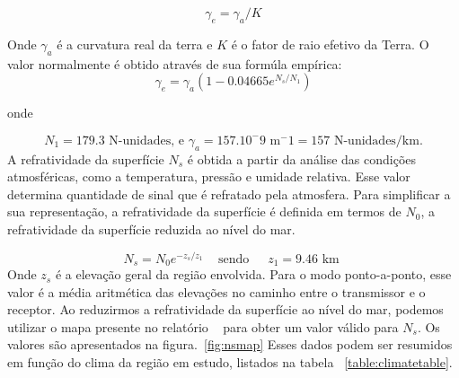 \[
\gamma_e = \gamma_a/K
\]

Onde $\gamma_a$ é a curvatura real da terra e $K$ é o fator de raio efetivo da Terra. O valor normalmente é obtido através de sua formúla empírica:
\[
\gamma_e = \gamma_a(1-0.04665e^{N_s/N_1})
\]

onde

\[
N_1 = 179.3 \text{ N-unidades, e } \gamma_a = 157 . 10^-9 \text{ m} ^-1 = 157 \text{ N-unidades/km.}
\]
A refratividade da superfície \begin{math}N_s\end{math} é obtida a partir da análise das condições atmosféricas, como a temperatura, pressão e umidade relativa. Esse valor determina quantidade de sinal que é refratado pela atmosfera.
Para simplificar a sua representação, a refratividade da superfície  é definida em termos de \begin{math}N_0\end{math}, a refratividade da superfície reduzida ao nível do mar.

\[
N_s = N_0e^{-z_s/z_1} \,\,\,\,\, \text{ sendo} \,\,\,\,\,\,\,\,\, z_1 = 9.46 \text{ km }
\]
Onde \begin{math}z_s\end{math} é a elevação geral da região envolvida. Para o modo ponto-a-ponto, esse valor é a média aritmética das elevações no caminho entre o transmissor e o receptor.
Ao reduzirmos a refratividade da superfície ao nível do mar, podemos utilizar o mapa presente no relatório ~\cite{longleyricedelta} para obter um valor válido para \begin{math}N_s\end{math}. Os valores são apresentados na figura.~\ref{fig:nsmap} Esses dados podem ser resumidos em função do clima da região em estudo, listados na tabela ~\ref{table:climatetable}.



\begin{table}[h]
\centering
\caption[Refratividade da superfície em função do clima da região.]
{Refratividade da superfície em função do clima da região.}
\label{table:climatetable}
\end{table}

